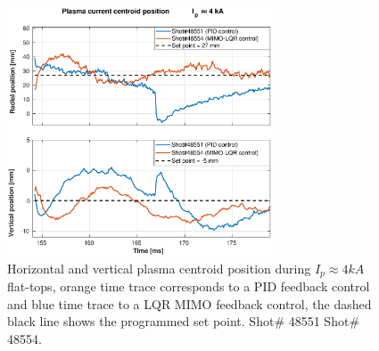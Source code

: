 \begin{figure}
	\centering
	\includegraphics[width=0.7\textwidth]{Chp5/PIDvsMIMO_551_554_2.eps}
	\caption{ Horizontal and vertical plasma centroid position during  $I_p\approx 4kA$  flat-tops, orange time trace corresponds to a PID feedback control and blue time trace to a LQR MIMO feedback control, the dashed black line shows the programmed set point. Shot$\#$ 48551 Shot$\#$ 48554. }
\end{figure}


